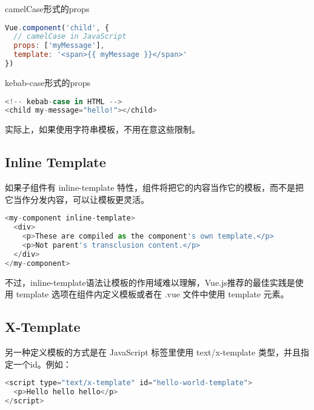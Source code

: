 \begin{compactitem}
\item camelCase形式的props

\begin{lstlisting}[language=JavaScript]
Vue.component('child', {
  // camelCase in JavaScript
  props: ['myMessage'],
  template: '<span>{{ myMessage }}</span>'
})
\end{lstlisting}

\item kebab-case形式的props

\begin{lstlisting}[language=JavaScript]
<!-- kebab-case in HTML -->
<child my-message="hello!"></child>
\end{lstlisting}


\end{compactitem}


实际上，如果使用字符串模板，不用在意这些限制。


\subsection{Inline Template}



如果子组件有 inline-template 特性，组件将把它的内容当作它的模板，而不是把它当作分发内容，可以让模板更灵活。

\begin{lstlisting}[language=JavaScript]
<my-component inline-template>
  <div>
    <p>These are compiled as the component's own template.</p>
    <p>Not parent's transclusion content.</p>
  </div>
</my-component>
\end{lstlisting}

不过，inline-template语法让模板的作用域难以理解，Vue.js推荐的最佳实践是使用 template 选项在组件内定义模板或者在 .vue 文件中使用 template 元素。


\subsection{X-Template}


另一种定义模板的方式是在 JavaScript 标签里使用 text/x-template 类型，并且指定一个id。例如：


\begin{lstlisting}[language=JavaScript]
<script type="text/x-template" id="hello-world-template">
  <p>Hello hello hello</p>
</script>
\end{lstlisting}


